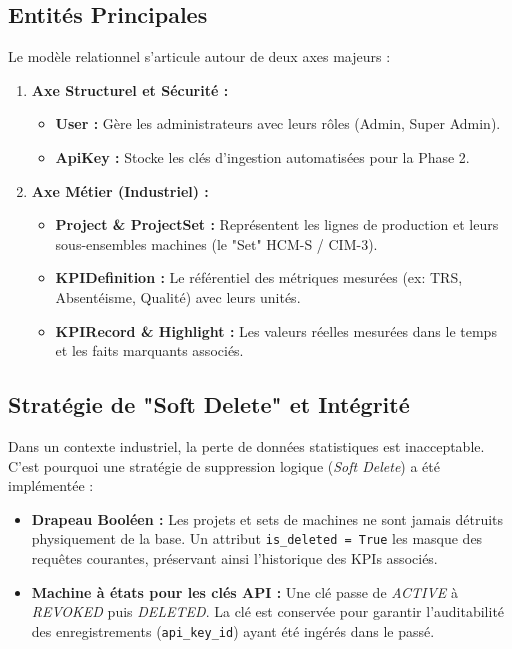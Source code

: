\subsection{Entités Principales}
Le modèle relationnel s'articule autour de deux axes majeurs :
\begin{enumerate}
    \item \textbf{Axe Structurel et Sécurité :}
    \begin{itemize}
        \item \textbf{User :} Gère les administrateurs avec leurs rôles (Admin, Super Admin).
        \item \textbf{ApiKey :} Stocke les clés d'ingestion automatisées pour la Phase 2.
    \end{itemize}
    \item \textbf{Axe Métier (Industriel) :}
    \begin{itemize}
        \item \textbf{Project \& ProjectSet :} Représentent les lignes de production et leurs sous-ensembles machines (le "Set" HCM-S / CIM-3).
        \item \textbf{KPIDefinition :} Le référentiel des métriques mesurées (ex: TRS, Absentéisme, Qualité) avec leurs unités.
        \item \textbf{KPIRecord \& Highlight :} Les valeurs réelles mesurées dans le temps et les faits marquants associés.
    \end{itemize}
\end{enumerate}

\subsection{Stratégie de "Soft Delete" et Intégrité}
Dans un contexte industriel, la perte de données statistiques est inacceptable. C'est pourquoi une stratégie de suppression logique (\textit{Soft Delete}) a été implémentée :
\begin{itemize}
    \item \textbf{Drapeau Booléen :} Les projets et sets de machines ne sont jamais détruits physiquement de la base. Un attribut \texttt{is\_deleted = True} les masque des requêtes courantes, préservant ainsi l'historique des KPIs associés.
    \item \textbf{Machine à états pour les clés API :} Une clé passe de \textit{ACTIVE} à \textit{REVOKED} puis \textit{DELETED}. La clé est conservée pour garantir l'auditabilité des enregistrements (\texttt{api\_key\_id}) ayant été ingérés dans le passé.
\end{itemize}

